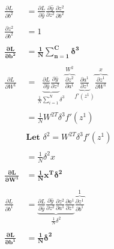 \documentclass{article}
\begin{document}
	\begin{align*}
		\frac{\partial L}{\partial b^2} &= \frac{\partial L}{\partial \hat{y}}\frac{\partial \hat{y}}{\partial z^2}\frac{\partial z^2}{\partial b^2}\\ \\
		\frac{\partial z^2}{\partial b^2} &= 1\\\\
		\boldsymbol{\frac{\partial L}{\partial b^2}} & \boldsymbol{=\frac{1}{N}\sum_{n=1}^C\delta^3}
	\\
	\\
		\frac{\partial L}{\partial W^1} &=\underbrace{ \frac{\partial L}{\partial \hat{y}}\frac{\partial \hat{y}}{\partial z^2}}_{\frac{1}{N}\sum_{i=1}^N\delta^3}
			\overbrace{\frac{\partial z^2}{\partial a^1}}^{W^2}
			\underbrace{\frac{\partial a^1}{\partial z^1}}_{f'(z^1)}
			\overbrace{\frac{\partial z^1}{\partial W^1}}^x\\ \\
		&= \frac{1}{N}W^{2T}\delta^3f'(z^1)\\ \\
		& \textbf{Let } \delta^2 = W^{2T}\delta^3f'(z^1)\\ \\
		&= \frac{1}{N}\delta^2x\\ \\
		\boldsymbol{\frac{\partial L}{\partial W^1}} & \boldsymbol{= \frac{1}{N}x^T\delta^2}
	\\
	\\
		\frac{\partial L}{\partial b^1} &= \underbrace{\frac{\partial L}{\partial \hat{y}}
			\frac{\partial \hat{y}}{\partial z^2}
			\frac{\partial z^2}{\partial a^1}
			\frac{\partial a^1}{\partial z^1}}_{\frac{1}{N}\delta^2}
			\overbrace{\frac{\partial z^1}{\partial b^1}}^1\\ \\
		\boldsymbol{\frac{\partial L}{\partial b^1}} &\boldsymbol{= \frac{1}{N}\delta^2}
	\end{align*}
\end{document}

